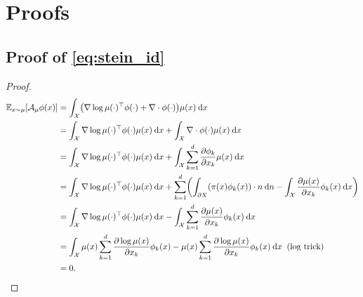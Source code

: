 \documentclass{article}
\newcommand{\E}{\mathbb{E}}
\newcommand{\X}{\mathcal{X}}
\newcommand{\A}{\mathcal{A}}
\newcommand{\diff}[2]{\frac{\partial #1}{\partial #2}}
\renewcommand{\d}{\: \mathrm{d}}
\DeclarePairedDelimiter{\pare}{(}{)}
\begin{document}



\appendix

\section{Proofs}
\subsection{Proof of \ref{eq:stein_id}}
\begin{proof}\label{proof:stein_id}
  \begin{align*}
    \E_{x \sim \mu}[\A_\mu \phi (x)] &=
      \int_\X \pare*{ \nabla \log \mu(\cdot)^\top \phi(\cdot) + \nabla \cdot \phi(\cdot) } \mu(x) \d x \\
    &= \int_\X \nabla \log \mu(\cdot)^\top \phi(\cdot) \mu(x) \d x + \int_\X \nabla \cdot \phi(\cdot) \mu(x) \d x \\
    &= \int_\X \nabla \log \mu(\cdot)^\top \phi(\cdot) \mu(x) \d x +
      \int_\X \sum_{k=1}^d \diff{\phi_k}{x_k} \mu(x) \d x \\
    &= \int_\X \nabla \log \mu(\cdot)^\top \phi(\cdot) \mu(x) \d x +
    \sum_{k=1}^d \pare*{\int_{\partial X}\pare*{\pi(x) \phi_k(x)} \cdot n \d n - \int_\X \diff{\mu(x)}{x_k} \phi_k(x) \d x} \\
    &= \int_\X \nabla \log \mu(\cdot)^\top \phi(\cdot) \mu(x) \d x -
      \int_\X \sum_{k=1}^d \diff{\mu(x)}{x_k} \phi_k(x) \d x \\
    &= \int_\X  \mu(x) \sum_{k=1}^d \diff{\log \mu(x)}{x_k}\phi_k(x) -
    \mu(x) \sum_{k=1}^d \diff{\log \mu(x)}{x_k} \phi_k(x) \d x \;\; \text{(log trick)} \\
    &= 0.
  \end{align*}
\end{proof}
\end{document}
